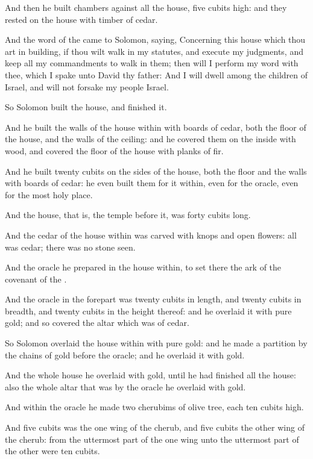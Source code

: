 \Verse And then he built chambers against all the house, five cubits high: and they rested on the house with timber of cedar.

\Verse And the word of the \LORD came to Solomon, saying, \Verse Concerning this house which thou art in building, if thou wilt walk in my statutes, and execute my judgments, and keep all my commandments to walk in them; then will I perform my word with thee, which I spake unto David thy father: \Verse And I will dwell among the children of Israel, and will not forsake my people Israel.

\Verse So Solomon built the house, and finished it.

\Verse And he built the walls of the house within with boards of cedar, both the floor of the house, and the walls of the ceiling: and he covered them on the inside with wood, and covered the floor of the house with planks of fir.

\Verse And he built twenty cubits on the sides of the house, both the floor and the walls with boards of cedar: he even built them for it within, even for the oracle, even for the most holy place.

\Verse And the house, that is, the temple before it, was forty cubits long.

\Verse And the cedar of the house within was carved with knops and open flowers: all was cedar; there was no stone seen.

\Verse And the oracle he prepared in the house within, to set there the ark of the covenant of the \LORD.

\Verse And the oracle in the forepart was twenty cubits in length, and twenty cubits in breadth, and twenty cubits in the height thereof: and he overlaid it with pure gold; and so covered the altar which was of cedar.

\Verse So Solomon overlaid the house within with pure gold: and he made a partition by the chains of gold before the oracle; and he overlaid it with gold.

\Verse And the whole house he overlaid with gold, until he had finished all the house: also the whole altar that was by the oracle he overlaid with gold.

\Verse And within the oracle he made two cherubims of olive tree, each ten cubits high.

\Verse And five cubits was the one wing of the cherub, and five cubits the other wing of the cherub: from the uttermost part of the one wing unto the uttermost part of the other were ten cubits.

